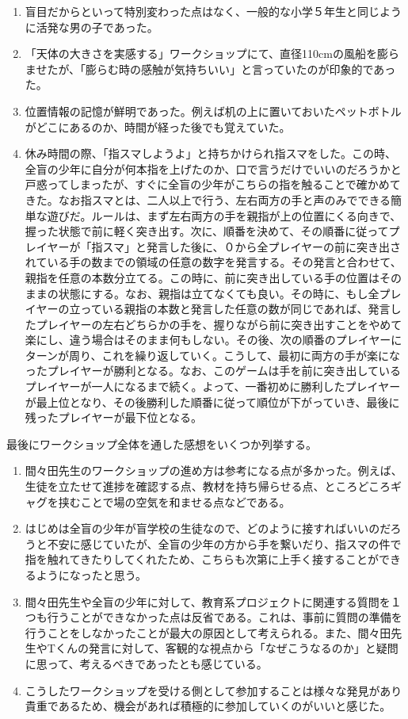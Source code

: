 \documentclass[openany,11pt,papersize]{jsbook}
\begin{document}
\begin{enumerate}
\item 盲目だからといって特別変わった点はなく、一般的な小学５年生と同じように活発な男の子であった。
\item「天体の大きさを実感する」ワークショップにて、直径110cmの風船を膨らませたが、「膨らむ時の感触が気持ちいい」と言っていたのが印象的であった。
\item 位置情報の記憶が鮮明であった。例えば机の上に置いておいたペットボトルがどこにあるのか、時間が経った後でも覚えていた。
\item 休み時間の際、「指スマしようよ」と持ちかけられ指スマをした。この時、全盲の少年に自分が何本指を上げたのか、口で言うだけでいいのだろうかと戸惑ってしまったが、すぐに全盲の少年がこちらの指を触ることで確かめてきた。なお指スマとは、二人以上で行う、左右両方の手と声のみでできる簡単な遊びだ。ルールは、まず左右両方の手を親指が上の位置にくる向きで、握った状態で前に軽く突き出す。次に、順番を決めて、その順番に従ってプレイヤーが「指スマ」と発言した後に、０から全プレイヤーの前に突き出されている手の数までの領域の任意の数字を発言する。その発言と合わせて、親指を任意の本数分立てる。この時に、前に突き出している手の位置はそのままの状態にする。なお、親指は立てなくても良い。その時に、もし全プレイヤーの立っている親指の本数と発言した任意の数が同じであれば、発言したプレイヤーの左右どちらかの手を、握りながら前に突き出すことをやめて楽にし、違う場合はそのまま何もしない。その後、次の順番のプレイヤーにターンが周り、これを繰り返していく。こうして、最初に両方の手が楽になったプレイヤーが勝利となる。なお、このゲームは手を前に突き出しているプレイヤーが一人になるまで続く。よって、一番初めに勝利したプレイヤーが最上位となり、その後勝利した順番に従って順位が下がっていき、最後に残ったプレイヤーが最下位となる。
\end{enumerate}
\par 最後にワークショップ全体を通した感想をいくつか列挙する。
\begin{enumerate}
\item 間々田先生のワークショップの進め方は参考になる点が多かった。例えば、生徒を立たせて進捗を確認する点、教材を持ち帰らせる点、ところどころギャグを挟むことで場の空気を和ませる点などである。
\item はじめは全盲の少年が盲学校の生徒なので、どのように接すればいいのだろうと不安に感じていたが、全盲の少年の方から手を繋いだり、指スマの件で指を触れてきたりしてくれたため、こちらも次第に上手く接することができるようになったと思う。
\item 間々田先生や全盲の少年に対して、教育系プロジェクトに関連する質問を１つも行うことができなかった点は反省である。これは、事前に質問の準備を行うことをしなかったことが最大の原因として考えられる。また、間々田先生やTくんの発言に対して、客観的な視点から「なぜこうなるのか」と疑問に思って、考えるべきであったとも感じている。
\item こうしたワークショップを受ける側として参加することは様々な発見があり貴重であるため、機会があれば積極的に参加していくのがいいと感じた。
\end{enumerate}
\end{document}
